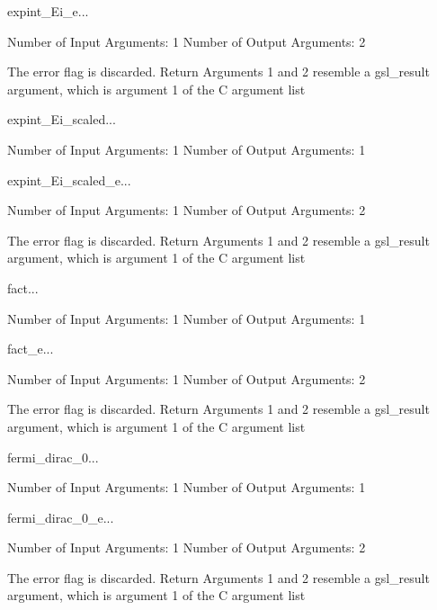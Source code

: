 \begin{funcdesc}{expint_Ei_e}{...}

    Number of Input  Arguments:  1
    Number of Output Arguments:  2

The error flag is discarded.
Return Arguments 1 and 2 resemble a gsl_result argument,
	which is  argument 1 of the C argument list

\end{funcdesc}

\begin{funcdesc}{expint_Ei_scaled}{...}

    Number of Input  Arguments:  1
    Number of Output Arguments:  1
\end{funcdesc}

\begin{funcdesc}{expint_Ei_scaled_e}{...}

    Number of Input  Arguments:  1
    Number of Output Arguments:  2

The error flag is discarded.
Return Arguments 1 and 2 resemble a gsl_result argument,
	which is  argument 1 of the C argument list

\end{funcdesc}

\begin{funcdesc}{fact}{...}

    Number of Input  Arguments:  1
    Number of Output Arguments:  1
\end{funcdesc}

\begin{funcdesc}{fact_e}{...}

    Number of Input  Arguments:  1
    Number of Output Arguments:  2

The error flag is discarded.
Return Arguments 1 and 2 resemble a gsl_result argument,
	which is  argument 1 of the C argument list

\end{funcdesc}

\begin{funcdesc}{fermi_dirac_0}{...}

    Number of Input  Arguments:  1
    Number of Output Arguments:  1
\end{funcdesc}

\begin{funcdesc}{fermi_dirac_0_e}{...}

    Number of Input  Arguments:  1
    Number of Output Arguments:  2

The error flag is discarded.
Return Arguments 1 and 2 resemble a gsl_result argument,
	which is  argument 1 of the C argument list

\end{funcdesc}

